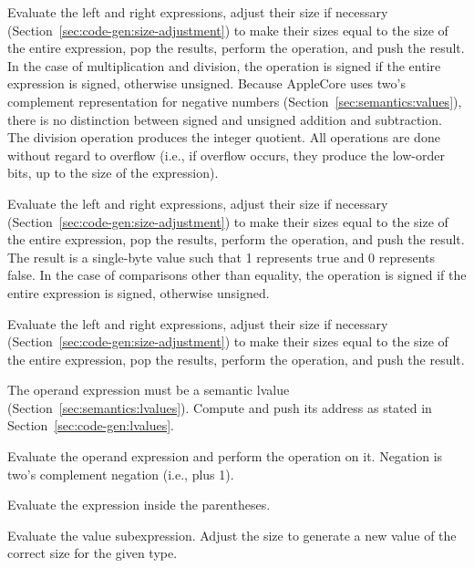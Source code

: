 \documentclass[10pt]{article}
\begin{document}
 Evaluate the left and right expressions, adjust their
size if necessary (Section~\ref{sec:code-gen:size-adjustment}) to make
their sizes equal to the size of the entire expression, pop the
results, perform the operation, and push the result.  In the case of
multiplication and division, the operation is signed if the entire
expression is signed, otherwise unsigned.  Because AppleCore uses
two's complement representation for negative numbers
(Section~\ref{sec:semantics:values}), there is no distinction between
signed and unsigned addition and subtraction.  The division operation
produces the integer quotient.  All operations are done without regard
to overflow (i.e., if overflow occurs, they produce the low-order
bits, up to the size of the expression).

 Evaluate the left and right expressions, adjust
their size if necessary (Section~\ref{sec:code-gen:size-adjustment})
to make their sizes equal to the size of the entire expression, pop
the results, perform the operation, and push the result.  The result
is a single-byte value such that 1 represents true and 0 represents
false.  In the case of comparisons other than equality, the operation
is signed if the entire expression is signed, otherwise unsigned.

Evaluate the left and right expressions, adjust their size if
necessary (Section~\ref{sec:code-gen:size-adjustment}) to make their
sizes equal to the size of the entire expression, pop the results,
perform the operation, and push the result.

%
 The operand expression must be a
semantic lvalue (Section~\ref{sec:semantics:lvalues}).  Compute and
push its address as stated in Section~\ref{sec:code-gen:lvalues}.

Evaluate the operand expression and perform the operation on it.
Negation is two's complement negation (i.e.,  plus 1).

 Evaluate the expression inside the
parentheses.

 Evaluate the value subexpression.  Adjust
the size to generate a new value of the correct size for the given
type.
\end{document}
